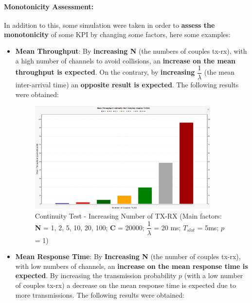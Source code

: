 \paragraph{Monotonicity Assessment:}
\noindent In addition to this, some simulation were taken in order to \textbf{assess the monotonicity} of some KPI by changing some factors, here some examples:
\begin{itemize}
	\item \textbf{Mean Throughput}: By \textbf{increasing N} (the numbers of couples tx-rx), with a high number of channels to avoid collisions, an \textbf{increase on the mean throughput is expected}. On the contrary, by \textbf{increasing} $\dfrac{1}{\lambda}$ (the mean inter-arrival time) an \textbf{opposite result is expected}. The following results were obtained:
	\begin{figure}[H]
		\centering
		\includegraphics[width=0.9\textwidth]{img/continuityTest_Throughput_TXRX_Varying.png}
		\caption{Continuity Test - Increasing Number of TX-RX (Main factors: \textbf{N} = 1, 2, 5, 10, 20, 100; \textbf{C} = 20000; $\dfrac{1}{\lambda}$ = 20 ms; $T_{slot}$ = 5ms; $p$ = 1)}
		\label {img: continuityTestThTXRX}
	\end{figure}
	\item \textbf{Mean Response Time}: By \textbf{Increasing N} (the number of couples tx-rx), with low numbers of channels, an \textbf{increase on the mean response time is expected}. By increasing the transmission probability $p$ (with a low number of couples tx-rx) a decrease on the mean response time is expected due to more transmissions. The following results were obtained:

\end{itemize}
